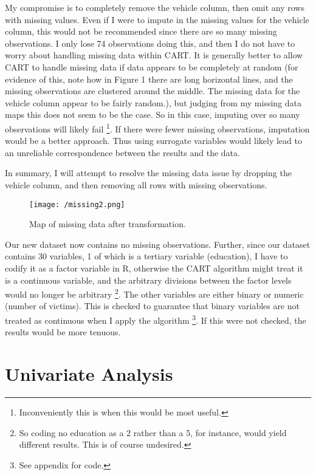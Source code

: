 \documentclass{article}
\begin{document}
My compromise is to completely remove the vehicle column, then omit any rows with missing values. Even if I were to impute in the missing values for the vehicle column, this would not be recommended since there are so many missing observations. I only lose 74 observations doing this, and then I do not have to worry about handling missing data within CART. It is generally better to allow CART to handle missing data if data appears to be completely at random (for evidence of this, note how in Figure 1 there are long horizontal lines, and the missing observations are clustered around the middle. The missing data for the vehicle column appear to be fairly random.), but judging from my missing data maps this does not seem to be the case. So in this case, imputing over so many observations will likely fail \footnote{Inconveniently this is when this would be most useful.}. If there were fewer missing observations, imputation would be a better approach. Thus using surrogate variables would likely lead to an unreliable correspondence between the results and the data. 

In summary, I will attempt to resolve the missing data issue by dropping the vehicle column, and then removing all rows with missing observations.

\begin{figure}[!htb]
    \centering
    \texttt{[image: /missing2.png]}
    \caption{Map of missing data after transformation.}
    \label{mis2}
\end{figure}

Our new dataset now contains no missing observations. Further, since our dataset contains 30 variables, 1 of which is a tertiary variable (education), I have to codify it as a factor variable in R, otherwise the CART algorithm might treat it is a continuous variable, and the arbitrary divisions between the factor levels would no longer be arbitrary \footnote{So coding no education as a 2 rather than a 5, for instance, would yield different results. This is of course undesired.}. The other variables are either binary or numeric (number of victims). This is checked to guarantee that binary variables are not treated as continuous when I apply the algorithm \footnote{See appendix for code.}. If this were not checked, the results would be more tenuous. 

\newpage

\section{Univariate Analysis}
\end{document}
